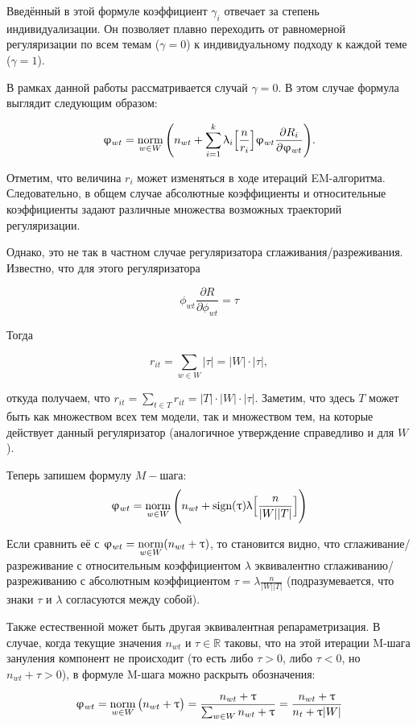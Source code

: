Введённый в этой формуле коэффициент $\gamma_i$ отвечает за степень индивидуализации. Он позволяет плавно переходить от равномерной регуляризации по всем темам ($\gamma = 0$) к индивидуальному подходу к каждой теме ($\gamma = 1$). 

В рамках данной работы рассматривается случай $\gamma = 0$. В этом случае формула выглядит следующим образом:

\[
\upvarphi_{wt} = \mathop{\mathrm{norm}}\limits_{w \in W}\Bigg(
    n_{wt} + \sum_{i=1}^k \uplambda_i \Big[
        \frac{n}{r_i}
        \Big]
    \upvarphi_{wt} \frac{\partial R_i}{\partial \upvarphi_{wt}}
\Bigg).
\]

Отметим, что величина $r_{i}$ может изменяться в ходе итераций EM-алгоритма. Следовательно, в общем случае абсолютные коэффициенты и относительные  коэффициенты задают различные множества возможных траекторий регуляризации.

Однако, это не так в частном случае регуляризатора сглаживания/разреживания. Известно, что для этого регуляризатора 

\[
\phi_{wt} \frac{\partial R}{\partial \phi_{wt}} = \tau
\]

Тогда

\[
r_{it} = \sum_{w\in W} \Big| \tau \Big| = |W| \cdot |\tau|,
\]

откуда получаем, что $r_{it} = \sum_{t\in T} r_{it} = |T| \cdot |W| \cdot |\tau|$. Заметим, что здесь $T$ может быть как множеством всех тем модели, так и множеством тем, на которые действует данный регуляризатор (аналогичное утверждение справедливо и для $W$).

Теперь запишем формулу $M-$шага:
\[
    \upvarphi_{wt} = \mathop{\mathrm{norm}}\limits_{w \in W}\Bigg(
        n_{wt} + \textup{sign}(\uptau) \uplambda \Big[
            \frac{n}{|W||T|}
            \Big]
    \Bigg)
\]

Если сравнить её с $\upvarphi_{wt} = \mathop{\mathrm{norm}}\limits_{w \in W}(n_{wt} + \uptau)$, то становится видно, что сглаживание/разреживание с относительным коэффициентом $\lambda$ эквивалентно сглаживанию/разреживанию с абсолютным коэффициентом $\tau=\lambda \frac{n}{|W||T|}$ (подразумевается, что знаки $\tau$ и $\lambda$ согласуются между собой).

Также естественной может быть другая эквивалентная репараметризация. В случае, когда текущие значения $n_{wt}$ и $\tau \in \mathbb{R}$ таковы, что на этой итерации M-шага зануления компонент не происходит (то есть либо $\tau > 0$, либо $\tau < 0$, но $n_{wt} + \tau > 0$), в формуле M-шага можно раскрыть обозначения:

\[
\upvarphi_{wt} = \mathop{\mathrm{norm}}\limits_{w \in W} \big( n_{wt} + \uptau \big) = \frac{n_{wt} + \uptau }{\sum_{w \in W} n_{wt} + \uptau } = \frac{n_{wt} + \uptau }{n_{t} + \uptau |W|}
\]

